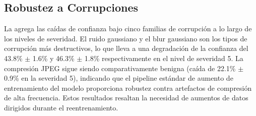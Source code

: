 \documentclass[10pt,twocolumn,letterpaper]{article}
\begin{document}
\begin{table}[htbp]
\centering
\caption{Tasa de éxito del ataque adversarial y caída de mAP a lo largo de las magnitudes de perturbación (media $\pm$ std sobre 3 semillas de entrenamiento independientes).}
\label{tab:adversarial}
\end{table}

\subsection{Robustez a Corrupciones}
La  agrega las caídas de confianza bajo cinco familias de corrupción a lo largo de los niveles de severidad. El ruido gaussiano y el blur gaussiano son los tipos de corrupción más destructivos, lo que lleva a una degradación de la confianza del 43.8\% $\pm$ 1.6\% y 46.3\% $\pm$ 1.8\% respectivamente en el nivel de severidad 5. La compresión JPEG sigue siendo comparativamente benigna (caída de 22.1\% $\pm$ 0.9\% en la severidad 5), indicando que el pipeline estándar de aumento de entrenamiento del modelo proporciona robustez contra artefactos de compresión de alta frecuencia. Estos resultados resaltan la necesidad de aumentos de datos dirigidos durante el reentrenamiento.
\end{document}
